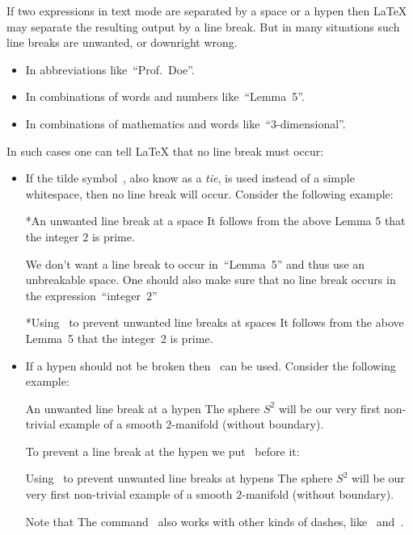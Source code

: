 If two expressions in text mode are separated by a space or a hypen then {\LaTeX} may separate the resulting output by a line break.
But in many situations such line breaks are unwanted, or downright wrong.
\begin{itemize}
  \item
    In abbreviations like~\enquote{Prof.~Doe}.
  \item
    In combinations of words and numbers like~\enquote{Lemma~5}.
  \item
    In combinations of mathematics and words like~\enquote{$3$\nobreakdash-dimensional}.
\end{itemize}
In such cases one can tell {\LaTeX} that no line break must occur:
\begin{itemize}
  \item
    If the tilde symbol~\inlinecode{\customtexttilde}, also know as a \emph{tie}, is used instead of a simple whitespace, then no line break will occur.
    Consider the following example:
    \begin{showlatex}*{An unwanted line break at a space}
It follows from the above Lemma 5 that the integer $2$ is prime.
    \end{showlatex}
    We don’t want a line break to occur in~\enquote{Lemma~5} and thus use an unbreakable space.
    One should also make sure that no line break occurs in the expression~\enquote{integer~$2$}
    \begin{showlatex}*{Using~\inlinecode{\customtexttilde} to prevent unwanted line breaks at spaces}
It follows from the above Lemma~5 that the integer~$2$ is prime.
    \end{showlatex}
  \item
    If a hypen should not be broken then~ can be used.
    Consider the following example:
    \begin{showlatex}{An unwanted line break at a hypen}
The sphere $S^2$ will be our very first non-trivial example of a smooth $2$-manifold (without boundary).
    \end{showlatex}
    To prevent a line break at the hypen we put~ before it:
    \begin{showlatex}{Using~ to prevent unwanted line breaks at hypens}
The sphere $S^2$ will be our very first non-trivial example of a smooth $2$\nobreakdash-manifold (without boundary).
    \end{showlatex}
    Note that 
    The command~ also works with other kinds of dashes, like~\inlinecode{--} and~\inlinecode{---}.
\end{itemize}





